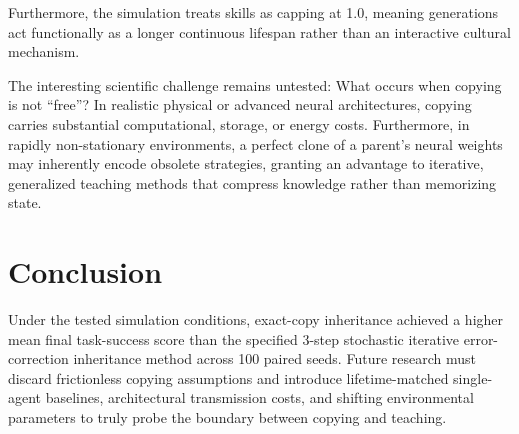 \documentclass[12pt]{article}
\begin{document}
Furthermore, the simulation treats skills as capping at 1.0, meaning generations act functionally as a longer continuous lifespan rather than an interactive cultural mechanism. 

The interesting scientific challenge remains untested: What occurs when copying is not ``free''? In realistic physical or advanced neural architectures, copying carries substantial computational, storage, or energy costs. Furthermore, in rapidly non-stationary environments, a perfect clone of a parent's neural weights may inherently encode obsolete strategies, granting an advantage to iterative, generalized teaching methods that compress knowledge rather than memorizing state.

\section{Conclusion}
Under the tested simulation conditions, exact-copy inheritance achieved a higher mean final task-success score than the specified 3-step stochastic iterative error-correction inheritance method across 100 paired seeds. Future research must discard frictionless copying assumptions and introduce lifetime-matched single-agent baselines, architectural transmission costs, and shifting environmental parameters to truly probe the boundary between copying and teaching.
\end{document}
